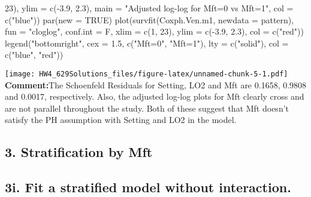 \documentclass[
]{article}
\newenvironment{Shaded}{\begin{snugshade}}{\end{snugshade}}
\newcommand{\AttributeTok}[1]{\textcolor[rgb]{0.77,0.63,0.00}{#1}}
\newcommand{\ConstantTok}[1]{\textcolor[rgb]{0.00,0.00,0.00}{#1}}
\newcommand{\DecValTok}[1]{\textcolor[rgb]{0.00,0.00,0.81}{#1}}
\newcommand{\FloatTok}[1]{\textcolor[rgb]{0.00,0.00,0.81}{#1}}
\newcommand{\FunctionTok}[1]{\textcolor[rgb]{0.00,0.00,0.00}{#1}}
\newcommand{\NormalTok}[1]{#1}
\newcommand{\SpecialCharTok}[1]{\textcolor[rgb]{0.00,0.00,0.00}{#1}}
\newcommand{\StringTok}[1]{\textcolor[rgb]{0.31,0.60,0.02}{#1}}
\begin{document}
\begin{Shaded}
\begin{Highlighting}[]
    \DecValTok{23}\NormalTok{), }\AttributeTok{ylim =} \FunctionTok{c}\NormalTok{(}\SpecialCharTok{{-}}\FloatTok{3.9}\NormalTok{, }\FloatTok{2.3}\NormalTok{), }\AttributeTok{main =} \StringTok{"Adjusted log{-}log for Mft=0 vs Mft=1"}\NormalTok{, }\AttributeTok{col =} \FunctionTok{c}\NormalTok{(}\StringTok{"blue"}\NormalTok{))}
\FunctionTok{par}\NormalTok{(}\AttributeTok{new =} \ConstantTok{TRUE}\NormalTok{)}
\FunctionTok{plot}\NormalTok{(}\FunctionTok{survfit}\NormalTok{(Coxph.Ven.m1, }\AttributeTok{newdata =}\NormalTok{ pattern), }\AttributeTok{fun =} \StringTok{"cloglog"}\NormalTok{, }\AttributeTok{conf.int =}\NormalTok{ F, }\AttributeTok{xlim =} \FunctionTok{c}\NormalTok{(}\DecValTok{1}\NormalTok{,}
    \DecValTok{23}\NormalTok{), }\AttributeTok{ylim =} \FunctionTok{c}\NormalTok{(}\SpecialCharTok{{-}}\FloatTok{3.9}\NormalTok{, }\FloatTok{2.3}\NormalTok{), }\AttributeTok{col =} \FunctionTok{c}\NormalTok{(}\StringTok{"red"}\NormalTok{))}
\FunctionTok{legend}\NormalTok{(}\StringTok{"bottomright"}\NormalTok{, }\AttributeTok{cex =} \FloatTok{1.5}\NormalTok{, }\FunctionTok{c}\NormalTok{(}\StringTok{"Mft=0"}\NormalTok{, }\StringTok{"Mft=1"}\NormalTok{), }\AttributeTok{lty =} \FunctionTok{c}\NormalTok{(}\StringTok{"solid"}\NormalTok{), }\AttributeTok{col =} \FunctionTok{c}\NormalTok{(}\StringTok{"blue"}\NormalTok{,}
    \StringTok{"red"}\NormalTok{))}
\end{Highlighting}
\end{Shaded}

\texttt{[image: HW4\_629Solutions\_files/figure-latex/unnamed-chunk-5-1.pdf]}
\textbf{Comment:}The Schoenfeld Residuals for Setting, LO2 and Mft are
0.1658, 0.9808 and 0.0017, respectively. Also, the adjusted log-log
plots for Mft clearly cross and are not parallel throughout the study.
Both of these suggest that Mft doesn't satisfy the PH assumption with
Setting and LO2 in the model.

\hypertarget{stratification-by-mft}{%
\subsection{3. Stratification by Mft}\label{stratification-by-mft}}

\hypertarget{i.-fit-a-stratified-model-without-interaction.}{%
\subsection{3i. Fit a stratified model without
interaction.}\label{i.-fit-a-stratified-model-without-interaction.}}
\end{document}
